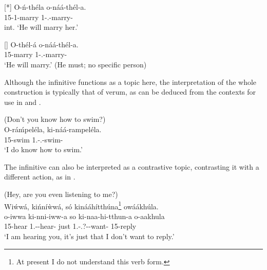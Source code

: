 \documentclass[output=paper]{langscibook}
\begin{document}
\ex
[*]{
\label{bkm:Ref110331585:c}
{\gll
O-ń{}-théla  o-náá-thél-a.  \\
15-1\OM{}-marry  1\SM{}-\PRS{}.\DJ{}-marry-\FV{} \\
}\jambox[1in]{[+OM,--OM]}
\glt
int. ‘He will marry her.’\\
}


\ex
[]{
\label{bkm:Ref110331585:d}
{\gll
O-thél-á  o-náá-thél-a.  \\
15-marry  1\SM{}-\PRS{}.\DJ{}-marry-\FV{}\\
}\jambox[1in]{[--OM,--OM]}
\glt
‘He will marry.’ (He must; no specific person)\\
}

\z
\z

Although the infinitive functions as a topic here, the interpretation of the whole construction is typically that of verum, as can be deduced from the contexts for use in  and . 

\ea
\label{bkm:Ref95391914}
(Don’t you know how to swim?)\\
\gll
O-ráḿpeléla, ki{}-náá{}-rampeléla.\\
15-swim  1\SG{}.\SM{}-\PRS{}.\DJ{}-swim-\FV{}\\
\glt
‘I do know how to swim.’

\z

The infinitive can also be interpreted as a contrastive topic, contrasting it with a different action, as in .

\ea
\label{bkm:Ref95391807}
(Hey, are you even listening to me?)\\
Wi\'{w}wá, kińní\`{w}wá, só kinááhítthúna\footnote{At present I do not understand this verb form.} owáákhúla.\\
\gll
o-iwwa  ki-nni-iww-a  so  ki-naa-hi-tthun-a  o-aakhula\\
15-hear  1\SG{}.\SM{}-\HAB{}-hear-\FV{}  just  1\SG{}.\SM{}-\PRS{}.\DJ{}?-\NEG{}-want-\FV{}  15-reply\\
\glt
‘I am hearing you, it’s just that I don't want to reply.’\\


\z
\end{document}
